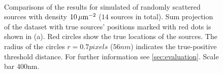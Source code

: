 \begin{figure}[!p]
	\centering
	\newcommand{\sizef}{.95}
	\\
	\caption{Comparisons of the results for simulated of randomly scattered sources with density $10\, \mathrm{\mu m}^{-2}$ ($14$ sources in total). Sum projection of the dataset with true sources' positions marked with red dots is shown in (a). Red circles show the true locations of the sources. The radius of the circles $r=0.7\unit{pixels}$ ($56\unit{nm}$) indicates the true-positive threshold distance. For further information see \autoref{sec:evaluation}. Scale bar 400\unit{nm}.}
	\label{fig:comparison density 10}
\end{figure}


